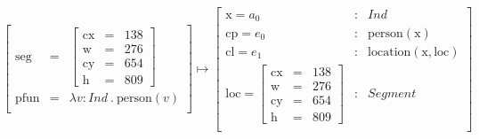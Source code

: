\documentclass[11pt, a4paper]{article}
\begin{document}
\begin{equation}\label{eq:indfunrec}
\left[\begin{array}{rcl}
\text{seg} &=& \left[\begin{array}{rcl}
\text{cx} &=& 138\\
\text{w} &=& 276\\
\text{cy} &=& 654\\
\text{h} &=& 809
\end{array}\right]\\
\text{pfun} &=& \lambda v:Ind\ .\ \text{person}(v)\\
\end{array}\right]
\mapsto
\left[\begin{array}{lcl}
    \text{x} = a_0 &:& Ind \\
    \text{cp} = e_0 &:& \text{person}(\text{x}) \\
    \text{cl} = e_1 &:& \text{location}(\text{x}, \text{loc}) \\
    \text{loc} = \left[\begin{array}{rcl}
\text{cx} &=& 138\\
\text{w} &=& 276\\
\text{cy} &=& 654\\
\text{h} &=& 809
\end{array}\right] &:& Segment\\
\end{array}\right]
\end{equation}

\end{document}
